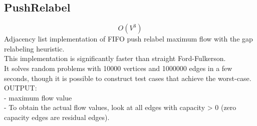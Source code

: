 \documentclass[11pt, oneside]{article}
\begin{document}
\subsection{PushRelabel}
\[O(V^3)\]
Adjacency list implementation of FIFO push relabel maximum flow with the gap relabeling heuristic.\\
This implementation is significantly faster than straight Ford-Fulkerson.\\
It solves random problems with 10000 vertices and 1000000 edges in a few seconds, though it is possible to construct test cases that achieve the worst-case.\\
OUTPUT:\\
    - maximum flow value\\
    - To obtain the actual flow values, look at all edges with capacity > 0 (zero capacity edges are residual edges).\\
\end{document}
